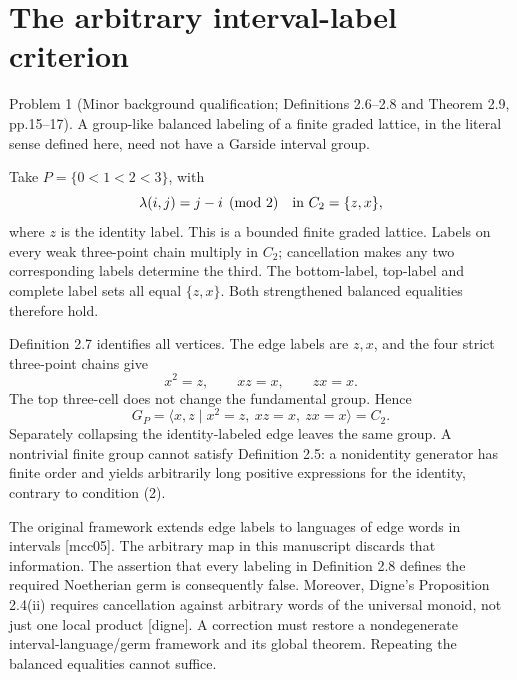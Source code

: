 \documentclass[10pt]{article}
\begin{document}
\section*{The arbitrary interval-label criterion}
Problem 1 (Minor background qualification; Definitions 2.6–2.8 and Theorem 2.9, pp.15–17).  A group-like balanced labeling of a finite graded lattice, in the literal sense defined here, need not have a Garside interval group.\par
Take \(P=\{0<1<2<3\}\), with \[\lambda(i,j)=j-i\pmod 2\quad\hbox{in }C_2=\{z,x\},\] where \(z\) is the identity label. This is a bounded finite graded lattice. Labels on every weak three-point chain multiply in \(C_2\); cancellation makes any two corresponding labels determine the third. The bottom-label, top-label and complete label sets all equal \(\{z,x\}\). Both strengthened balanced equalities therefore hold.\par
Definition 2.7 identifies all vertices. The edge labels are \(z,x\), and the four strict three-point chains give \[x^2=z,\qquad xz=x,\qquad zx=x.\] The top three-cell does not change the fundamental group. Hence \[G_P=\langle x,z\mid x^2=z,\ xz=x,\ zx=x\rangle=C_2.\] Separately collapsing the identity-labeled edge leaves the same group. A nontrivial finite group cannot satisfy Definition 2.5: a nonidentity generator has finite order and yields arbitrarily long positive expressions for the identity, contrary to condition (2).\par
The original framework extends edge labels to languages of edge words in intervals [mcc05]. The arbitrary map in this manuscript discards that information. The assertion that every labeling in Definition 2.8 defines the required Noetherian germ is consequently false. Moreover, Digne’s Proposition 2.4(ii) requires cancellation against arbitrary words of the universal monoid, not just one local product [digne]. A correction must restore a nondegenerate interval-language/germ framework and its global theorem. Repeating the balanced equalities cannot suffice.\par
\end{document}
